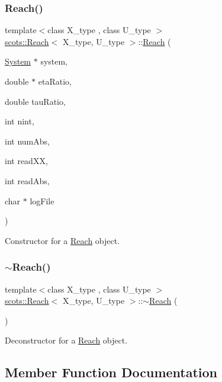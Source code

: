 \subsubsection{\texorpdfstring{Reach()}{Reach()}}
{\footnotesize\ttfamily template$<$class X\+\_\+type , class U\+\_\+type $>$ \\
\hyperlink{classscots_1_1Reach}{scots\+::\+Reach}$<$ X\+\_\+type, U\+\_\+type $>$\+::\hyperlink{classscots_1_1Reach}{Reach} (\begin{DoxyParamCaption}\item[{\hyperlink{classscots_1_1System}{System} $\ast$}]{system,  }\item[{double $\ast$}]{eta\+Ratio,  }\item[{double}]{tau\+Ratio,  }\item[{int}]{nint,  }\item[{int}]{num\+Abs,  }\item[{int}]{read\+XX,  }\item[{int}]{read\+Abs,  }\item[{char $\ast$}]{log\+File }\end{DoxyParamCaption})\hspace{0.3cm}{\ttfamily [inline]}}

Constructor for a \hyperlink{classscots_1_1Reach}{Reach} object. \mbox{\label{classscots_1_1Reach_a05425187c9015158f5495904c34342d0}} 
\subsubsection{\texorpdfstring{$\sim$\+Reach()}{~Reach()}}
{\footnotesize\ttfamily template$<$class X\+\_\+type , class U\+\_\+type $>$ \\
\hyperlink{classscots_1_1Reach}{scots\+::\+Reach}$<$ X\+\_\+type, U\+\_\+type $>$\+::$\sim$\hyperlink{classscots_1_1Reach}{Reach} (\begin{DoxyParamCaption}{ }\end{DoxyParamCaption})\hspace{0.3cm}{\ttfamily [inline]}}

Deconstructor for a \hyperlink{classscots_1_1Reach}{Reach} object. 

\subsection{Member Function Documentation}
\mbox{\label{classscots_1_1Reach_ad49c77293343ad0ce4f36c9deee45f00}} 
